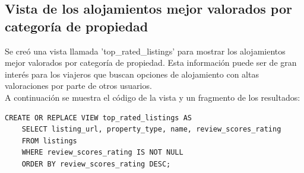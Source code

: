 \subsection{Vista de los alojamientos mejor valorados por categoría de propiedad}

Se creó una vista llamada 'top\_rated\_listings' para mostrar los alojamientos mejor valorados por categoría de propiedad. Esta información puede ser de gran interés para los viajeros que buscan opciones de alojamiento con altas valoraciones por parte de otros usuarios. \\
A continuación se muestra el código de la vista y un fragmento de los resultados:

\begin{verbatim}
CREATE OR REPLACE VIEW top_rated_listings AS
	SELECT listing_url, property_type, name, review_scores_rating
	FROM listings
	WHERE review_scores_rating IS NOT NULL
	ORDER BY review_scores_rating DESC;
\end{verbatim}

